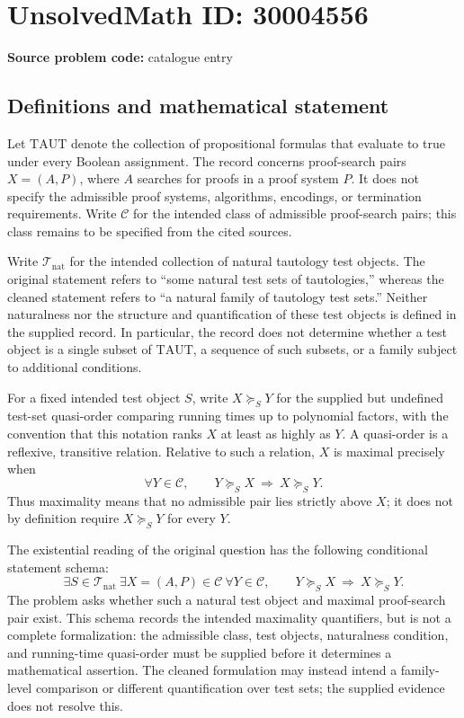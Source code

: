 \documentclass[11pt]{article}
\begin{document}
\section*{UnsolvedMath ID: 30004556}
\textbf{Source problem code:} catalogue entry
\subsection{Definitions and mathematical statement}
Let \(\mathrm{TAUT}\) denote the collection of propositional formulas that evaluate to true under every Boolean assignment. The record concerns proof-search pairs \(X=(A,P)\), where \(A\) searches for proofs in a proof system \(P\). It does not specify the admissible proof systems, algorithms, encodings, or termination requirements. Write \(\mathcal C\) for the intended class of admissible proof-search pairs; this class remains to be specified from the cited sources.

Write \(\mathcal T_{\mathrm{nat}}\) for the intended collection of natural tautology test objects. The original statement refers to ``some natural test sets of tautologies,'' whereas the cleaned statement refers to ``a natural family of tautology test sets.'' Neither naturalness nor the structure and quantification of these test objects is defined in the supplied record. In particular, the record does not determine whether a test object is a single subset of \(\mathrm{TAUT}\), a sequence of such subsets, or a family subject to additional conditions.

For a fixed intended test object \(S\), write \(X\succeq_S Y\) for the supplied but undefined test-set quasi-order comparing running times up to polynomial factors, with the convention that this notation ranks \(X\) at least as highly as \(Y\). A quasi-order is a reflexive, transitive relation. Relative to such a relation, \(X\) is maximal precisely when
\[
\forall Y\in\mathcal C,\qquad
Y\succeq_S X\ \Longrightarrow\ X\succeq_S Y.
\]
Thus maximality means that no admissible pair lies strictly above \(X\); it does not by definition require \(X\succeq_S Y\) for every \(Y\).

The existential reading of the original question has the following conditional statement schema:
\[
\exists S\in\mathcal T_{\mathrm{nat}}\ \exists X=(A,P)\in\mathcal C\ 
\forall Y\in\mathcal C,\qquad
Y\succeq_S X\ \Longrightarrow\ X\succeq_S Y.
\]
The problem asks whether such a natural test object and maximal proof-search pair exist. This schema records the intended maximality quantifiers, but is not a complete formalization: the admissible class, test objects, naturalness condition, and running-time quasi-order must be supplied before it determines a mathematical assertion. The cleaned formulation may instead intend a family-level comparison or different quantification over test sets; the supplied evidence does not resolve this.
\end{document}
